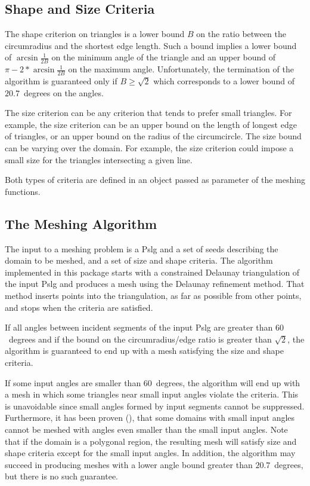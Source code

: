 \subsection{Shape and Size Criteria}
\label{sec:Mesh_2_criteria}

The shape criterion on triangles is a lower bound $B$ on the ratio
between the circumradius and the shortest edge length.  Such a bound
implies a lower bound of $\arcsin{\frac{1}{2B}}$ on the minimum angle
of the triangle and an upper bound of $\pi - 2* \arcsin{\frac{1}{2B}}$
on the maximum angle.  Unfortunately, the termination of the algorithm
is guaranteed only if $B \ge \sqrt{2}$ which corresponds to a lower
bound of $20.7$~degrees on the angles.

The size criterion can be any criterion that tends to prefer small
triangles. For example, the size criterion can be an upper bound on the
length of longest edge of triangles, or an upper bound on the radius of the
circumcircle. The size bound can be varying over the domain. For example,
the size criterion could impose a small size for the triangles intersecting
a given line.

Both types of criteria are defined in an object  passed as
parameter of the meshing functions.

\subsection{The Meshing Algorithm}

The input to a meshing problem is a {\sc Pslg} and a set of seeds
describing the domain to be meshed, and a set of size and shape
criteria.  The algorithm implemented in this package starts with a
constrained Delaunay triangulation of the input {\sc Pslg} and produces a
mesh using the Delaunay refinement method. That method inserts points into
the triangulation, as far as possible from other points, and stops when the
criteria are satisfied.

If all angles between incident segments of the input {\sc Pslg}
are greater than $60$~degrees and if the bound on the
circumradius/edge ratio is greater than $\sqrt{2}$,
the algorithm is guaranteed to end up with a mesh
satisfying the size and shape criteria.

If some input angles are smaller than $60$~degrees, the algorithm will
end up with a mesh in which some triangles near small input angles
violate the criteria.  This is unavoidable since small angles formed
by input segments cannot be suppressed. Furthermore, it has been
proven (\cite{s-mgdsa-00}), that some domains with small input angles
cannot be meshed with angles even smaller than the small input angles.
Note that if the domain is a polygonal region, the resulting mesh will
satisfy size and shape criteria except for the small input angles.
In addition, the algorithm may succeed in producing meshes with a lower
angle bound greater than $20.7$~degrees, but there is no such guarantee.

